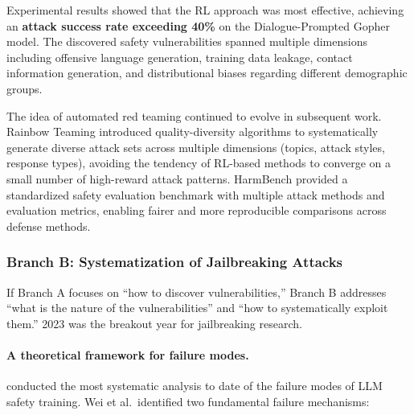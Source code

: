 Experimental results showed that the RL approach was most effective, achieving
an \textbf{attack success rate exceeding 40\%} on the Dialogue-Prompted Gopher model.
The discovered safety vulnerabilities spanned multiple dimensions including offensive language generation, training data leakage, contact information generation,
and distributional biases regarding different demographic groups.

\noindent
The idea of automated red teaming continued to evolve in subsequent work.
Rainbow Teaming \cite{samvelyan2024rainbow} introduced quality-diversity algorithms
to systematically generate diverse attack sets across multiple dimensions (topics, attack styles, response types),
avoiding the tendency of RL-based methods to converge on a small number of high-reward attack patterns.
HarmBench \cite{mazeika2024harmbench} provided a standardized safety evaluation benchmark
with multiple attack methods and evaluation metrics, enabling fairer and more reproducible comparisons across defense methods.

\subsubsection{Branch B: Systematization of Jailbreaking Attacks}
\label{sec:t3-jailbreak}

If Branch A focuses on ``how to discover vulnerabilities,''
Branch B addresses ``what is the nature of the vulnerabilities'' and ``how to systematically exploit them.''
2023 was the breakout year for jailbreaking research.

\paragraph{A theoretical framework for failure modes.}
 conducted the most systematic analysis to date
of the failure modes of LLM safety training.
Wei et al.\ identified two fundamental failure mechanisms:

